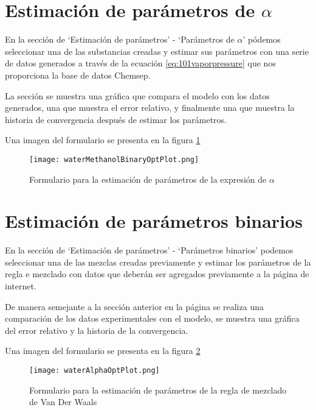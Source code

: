 	
\section{Estimación de parámetros de $\alpha$}\label{sec:webAlphaOptim}
	En la sección de `Estimación de parámetros' - `Parámetros de $\alpha$' pódemos seleccionar una de las substancias creadas y estimar sus parámetros con una serie de datos generados a través de la ecuación \ref{eq:101vaporpressure} que nos proporciona la base de datos Chemsep.

	La sección se muestra una gráfica que compara el modelo con los datos generados, una que muestra el error relativo, y finalmente una que muestra la historia de convergencia después de estimar los parámetros.

	Una imagen del formulario se presenta en la figura \ref{fig:alphaOptim}

\begin{figure}
	\texttt{[image: waterMethanolBinaryOptPlot.png]}
	\caption{Formulario para la estimación de parámetros de la expresión de $\alpha$}
	\label{fig:alphaOptim}
\end{figure}


\section{Estimación de parámetros binarios}\label{sec:webBinaryOptim}
	En la sección de `Estimación de parámetros' - `Parámetros binarios' podemos seleccionar una de las mezclas creadas previamente y estimar los parámetros de la regla e mezclado con datos que deberán ser agregados previamente a la página de internet.

	De manera semejante a la sección anterior en la página se realiza una comparación de los datos experimentales con el modelo, se muestra una gráfica del error relativo y la historia de la convergencia.

	Una imagen del formulario se presenta en la figura \ref{fig:binaryOptim}
\begin{figure}
	\texttt{[image: waterAlphaOptPlot.png]}
	\caption{Formulario para la estimación de parámetros de la regla de mezclado de Van Der Waals}
	\label{fig:binaryOptim}
\end{figure}



